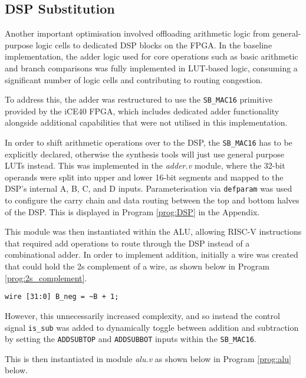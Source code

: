 \documentclass[a4paper,10pt]{article}
\begin{document}
\subsection{DSP Substitution}
\label{sec:DSP}

Another important optimisation involved offloading arithmetic logic 
from general-purpose logic cells to dedicated DSP blocks on the FPGA. 
In the baseline implementation, the adder logic used for core operations 
such as basic arithmetic and branch comparisons 
was fully implemented in LUT-based logic, 
consuming a significant number of logic cells and contributing to routing congestion. 

To address this, the adder was restructured to use the 
\texttt{SB\_MAC16} primitive provided by the iCE40 FPGA, 
which includes dedicated adder functionality alongside 
additional capabilities that were not utilised in this implementation.

In order to shift arithmetic operations over to the DSP,
the \texttt{SB\_MAC16} has to be explicitly declared,
otherwise the synthesis tools will just use general purpose LUTs instead.
This was implemented in the \textit{adder.v} module, 
where the 32-bit operands were split into upper and lower 16-bit segments 
and mapped to the DSP's internal A, B, C, and D inputs. 
Parameterisation via \texttt{defparam} was used to configure the carry chain 
and data routing between the top and bottom halves of the DSP.
This is displayed in Program \ref{prog:DSP} in the Appendix.

This module was then instantiated within the ALU, allowing RISC-V instructions 
that required add operations to route through the DSP instead 
of a combinational adder. 
In order to implement addition, initially a wire was created that could
hold the 2s complement of a wire, as shown below in Program \ref{prog:2s_complement}.

\begin{lstlisting}[style=verilog-style, caption=
    {2s complement}, label={prog:2s_complement}]
wire [31:0] B_neg = ~B + 1;
\end{lstlisting}

However, this unnecessarily increased complexity, and so instead
the control signal \texttt{is\_sub} was added to dynamically toggle between 
addition and subtraction by setting the 
\texttt{ADDSUBTOP} and \texttt{ADDSUBBOT} inputs
within the \texttt{SB\_MAC16}. 

This is then instantiated in module \textit{alu.v}
as shown below in Program \ref{prog:alu} below.
\end{document}
